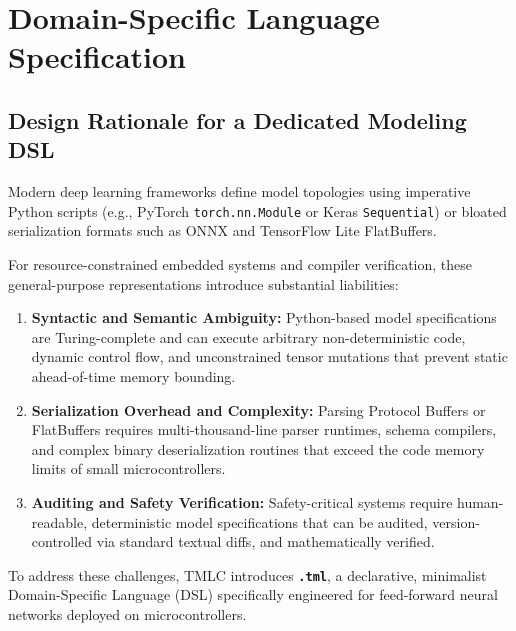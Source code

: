 \documentclass[11pt,a4paper]{article}
\begin{document}
\section{Domain-Specific Language Specification}
\label{sec:dsl_spec}

\subsection{Design Rationale for a Dedicated Modeling DSL}
Modern deep learning frameworks define model topologies using imperative Python scripts (e.g., PyTorch \texttt{torch.nn.Module} or Keras \texttt{Sequential}) or bloated serialization formats such as ONNX and TensorFlow Lite FlatBuffers. 

For resource-constrained embedded systems and compiler verification, these general-purpose representations introduce substantial liabilities:
\begin{enumerate}[leftmargin=*]
    \item \textbf{Syntactic and Semantic Ambiguity:} Python-based model specifications are Turing-complete and can execute arbitrary non-deterministic code, dynamic control flow, and unconstrained tensor mutations that prevent static ahead-of-time memory bounding.
    \item \textbf{Serialization Overhead and Complexity:} Parsing Protocol Buffers or FlatBuffers requires multi-thousand-line parser runtimes, schema compilers, and complex binary deserialization routines that exceed the code memory limits of small microcontrollers.
    \item \textbf{Auditing and Safety Verification:} Safety-critical systems require human-readable, deterministic model specifications that can be audited, version-controlled via standard textual diffs, and mathematically verified.
\end{enumerate}

To address these challenges, TMLC introduces \textbf{\texttt{.tml}}, a declarative, minimalist Domain-Specific Language (DSL) specifically engineered for feed-forward neural networks deployed on microcontrollers.
\end{document}
